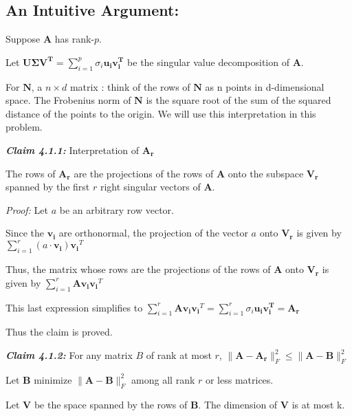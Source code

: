 \documentclass[fleqn, 11pt]{article}
\newcommand{\bs}[1]{\boldsymbol{#1}}
\begin{document}
\hrulefill

\subsection*{An Intuitive Argument: }


\medskip

Suppose $\bs{A}$ has rank-$p$.

Let $\bs{U \Sigma V^T}= \displaystyle \sum_{i=1}^{p} \sigma_i \bs{u_i v_i^T}  $ be the singular value decomposition of $\bs{A}$. 


For $\bs{N}$,  a $n \times d$ matrix : think of the rows of  $\bs{N}$ as n points in d-dimensional
space. The Frobenius norm of  $\bs{N}$ is the square root of the sum of the squared distance of
the points to the origin. We will use this interpretation in this problem. 

\newpage

{ \large  \textbf{\textit{Claim 4.1.1:}}} Interpretation of $\bs{A_r}$

\medskip

The rows of $\bs{A_r}$ are the projections of the rows of $\bs{A}$ onto the subspace $\bs{V_r}$
spanned by the first $r$ right singular vectors of $\bs{A}$. 


{\textit{Proof: }} Let $a$ be an arbitrary row vector.

Since the $\bs{v_i}$ are orthonormal, the projection of the vector $a$ onto $\bs{V_r}$ is given by 
$\displaystyle \sum_{i=1}^{r} (a \cdot \bs{v_i}) \bs{v_i}^T $

Thus, the matrix whose rows are the
projections of the rows of $\bs{A}$ onto $\bs{V_r}$  is given by 
$\displaystyle \sum_{i=1}^{r} \bs{A} \bs{v_i} \bs{v_i}^T $

This last expression simplifies to $\displaystyle \sum_{i=1}^{r} \bs{A} \bs{v_i} \bs{v_i}^T =  \displaystyle \sum_{i=1}^{r} \sigma_i \bs{u_i v_i^T} = \bs{A_r}  $


Thus the claim is proved. 

\bigskip 

{ \large  \textbf{\textit{Claim 4.1.2:}}} For any matrix $B$ of rank at most $r$, 
$  \|\bs{A}-\bs{A_r}\|^2_F \leq \|\bs{A}-\bs{B}\|^2_F $

\medskip 

Let $\bs{B}$ minimize $ \|\bs{A}-\bs{B}\|^2_F$ among all rank $r$ or less matrices.

\smallskip

Let $\bs{V}$ be the space
spanned by the rows of $\bs{B}$. The dimension of $\bs{V}$  is at most k.  
\end{document}
